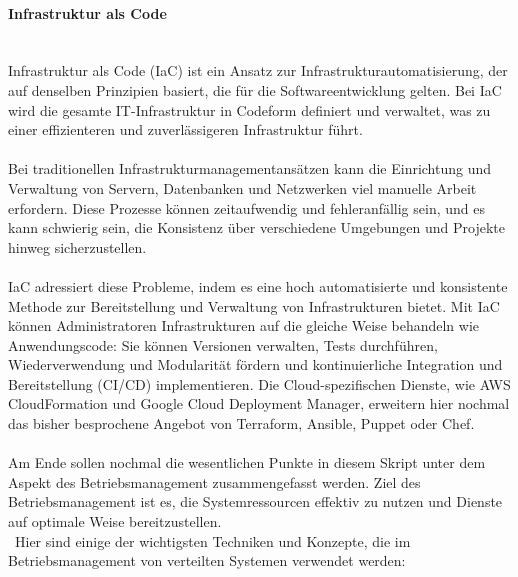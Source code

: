 \paragraph{Infrastruktur als Code \\\\}
Infrastruktur als Code (IaC) ist ein Ansatz zur Infrastrukturautomatisierung, der auf denselben Prinzipien basiert, die für die Softwareentwicklung gelten. Bei IaC wird die gesamte IT-Infrastruktur in Codeform definiert und verwaltet, was zu einer effizienteren und zuverlässigeren Infrastruktur führt.
\\\\
Bei traditionellen Infrastrukturmanagementansätzen kann die Einrichtung und Verwaltung von Servern, Datenbanken und Netzwerken viel manuelle Arbeit erfordern. Diese Prozesse können zeitaufwendig und fehleranfällig sein, und es kann schwierig sein, die Konsistenz über verschiedene Umgebungen und Projekte hinweg sicherzustellen.
\\\\
IaC adressiert diese Probleme, indem es eine hoch automatisierte und konsistente Methode zur Bereitstellung und Verwaltung von Infrastrukturen bietet. Mit IaC können Administratoren Infrastrukturen auf die gleiche Weise behandeln wie Anwendungscode: Sie können Versionen verwalten, Tests durchführen, Wiederverwendung und Modularität fördern und kontinuierliche Integration und Bereitstellung (CI/CD) implementieren.
Die Cloud-spezifischen Dienste, wie AWS CloudFormation und Google Cloud Deployment Manager, erweitern hier nochmal das bisher besprochene Angebot von Terraform, Ansible, Puppet oder Chef.
\\\\ 
Am Ende sollen nochmal die wesentlichen Punkte in diesem Skript unter dem Aspekt des Betriebsmanagement zusammengefasst werden. Ziel des Betriebsmanagement ist es, die Systemressourcen effektiv zu nutzen und Dienste auf optimale Weise bereitzustellen.
\\\
Hier sind einige der wichtigsten Techniken und Konzepte, die im Betriebsmanagement von verteilten Systemen verwendet werden:
